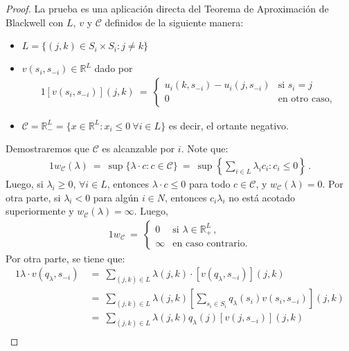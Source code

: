 \begin{proof}
La prueba es una aplicación directa del Teorema de Aproximación de Blackwell con $L$, $v$ y $\mathcal{C}$ definidos de la siguiente manera:
\begin{itemize}[noitemsep]
  \item $L = \{ (j, k) \in S_i \times S_{i}  : j \neq k \}$
  \item $v(s_i, s_{-i}) \in \mathbb{R}^L$ dado por
    \begin{alignat}{1}
      [v(s_i, s_{-i})](j, k)\ =\  
        \begin{cases}
          u_i(k, s_{-i}) - u_i(j, s_{-i}) & \text{si } s_i = j \\
          0 & \text{en otro caso,}
        \end{cases}
    \end{alignat}
  \item $\mathcal{C} = \mathbb{R}^L_{-} = \{x \in \mathbb{R}^L : x_i \leq 0\ \forall i \in L \}$ es decir, el ortante negativo.
\end{itemize}
Demostraremos que $\mathcal{C}$ es alcanzable por $i$.
Note que:
\begin{alignat}{1}
	w_{\mathcal{C}}(\lambda)\ =\ \sup\{\lambda \cdot c : c \in \mathcal{C} \}\ =\ \sup \left \{ \sum_{i \in L} \lambda_i c_i : c_i \leq 0 \right \} \,.
\end{alignat}
Luego, si $\lambda_i \geq 0$, $\forall i \in L$, entonces $\lambda \cdot c \leq 0$ para todo $c \in \mathcal{C}$, y $w_{\mathcal{C}}(\lambda) = 0$. Por otra parte, si $\lambda_i < 0$ para algún $i\in N$, entonces $c_i \lambda_i$ no está acotado superiormente y  $w_{\mathcal{C}}(\lambda) = \infty$. Luego,
\begin{alignat}{1}
  w_{\mathcal{C}}\ =\  
	\begin{cases}
	  0 & \text{si } \lambda \in \mathbb{R}^L_+ \,, \\
	  \infty & \text{en caso contrario.}
	\end{cases}
\end{alignat}
Por otra parte, se tiene que:
\begin{alignat}{1}
	\lambda \cdot v(q_{\lambda}, s_{-i})\ 
	  &=\ \sum_{(j,k) \in L} \lambda(j,k) \cdot [v(q_{\lambda}, s_{-i})](j, k) \\
	&=\ \sum_{(j,k) \in L} \lambda(j, k)\left[\sum_{s_i \in S_i} q_{\lambda}(s_i) v(s_i, s_{-i}) \right](j, k) \\
	&=\ \sum_{(j,k) \in L} \lambda(j, k) q_{\lambda}(j) [v(j, s_{-i})](j, k) \\

\end{alignat}
\end{proof}

